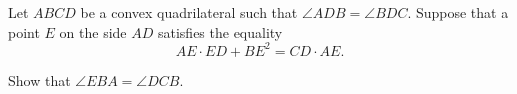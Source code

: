 Let $ABCD$ be a convex quadrilateral such that $\angle ADB=\angle BDC$. Suppose that a point $E$ on the side $AD$ satisfies the equality\[AE\cdot ED + BE^2=CD\cdot AE.\]

Show that $\angle EBA=\angle DCB$.